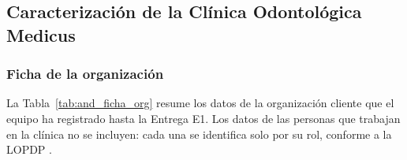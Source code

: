 %

\subsection{Caracterizaci{\'o}n de la Cl{\'i}nica Odontol{\'o}gica Medicus}

\subsubsection{Ficha de la organizaci{\'o}n}

La Tabla~\ref{tab:and_ficha_org} resume los datos de la organizaci{\'o}n cliente que el equipo ha registrado hasta la Entrega E1. Los datos de las personas que trabajan en la cl{\'i}nica no se incluyen: cada una se identifica solo por su rol, conforme a la LOPDP \cite{lopdp2021}.

